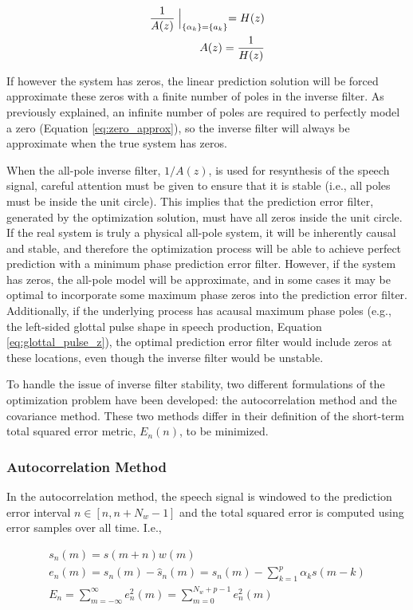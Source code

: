\begin{eqnarray}
	\frac{1}{A(z)}\Bigm|_{\{\alpha_k\}=\{a_k\}}=H(z) \\
	A(z)=\frac{1}{H(z)}
\end{eqnarray}

If however the system has zeros, the linear prediction solution will be forced approximate these zeros with a finite number of poles in the inverse filter. As previously explained, an infinite number of poles are required to perfectly model a zero (Equation \ref{eq:zero_approx}), so the inverse filter will always be approximate when the true system has zeros.

When the all-pole inverse filter, $1/A(z)$,  is used for resynthesis of the speech signal, careful attention must be given to ensure that it is stable (i.e., all poles must be inside the unit circle). This implies that the prediction error filter, generated by the optimization solution, must have all zeros inside the unit circle. If the real system is truly a physical all-pole system, it will be inherently causal and stable, and therefore the optimization process will be able to achieve perfect prediction with a minimum phase prediction error filter. However, if the system has zeros, the all-pole model will be approximate, and in some cases it may be optimal to incorporate some maximum phase zeros into the prediction error filter. Additionally, if the underlying process has acausal maximum phase poles (e.g., the left-sided glottal pulse shape in speech production, Equation \ref{eq:glottal_pulse_z}), the optimal prediction error filter would include zeros at these locations, even though the inverse filter would be unstable.

To handle the issue of inverse filter stability, two different formulations of the optimization problem have been developed: the autocorrelation method and the covariance method. These two methods differ in their definition of the short-term total squared error metric, $E_n(n)$, to be minimized. 


\subsubsection{Autocorrelation Method} \label{lp_autocor}

In the autocorrelation method, the speech signal is windowed to the prediction error interval $n \in [n, n+N_w-1]$ and the total squared error is computed using error samples over all time. I.e.,

\begin{eqnarray}
	s_n(m) = s(m+n)w(m) \\
	e_n(m) = s_n(m) - \hat{s}_n(m) = s_n(m) - \sum_{k=1}^{p} \alpha_k s(m-k) \\
	E_n = \sum_{m=-\infty}^{\infty}e_n^2(m) = \sum_{m=0}^{N_w+p-1}e_n^2(m) \label{eq:autocorr_tse}
\end{eqnarray}

